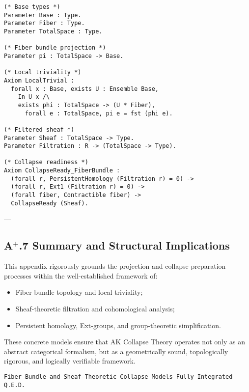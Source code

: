 \documentclass[11pt]{article}
\begin{document}
\begin{lstlisting}[language=Coq]
(* Base types *)
Parameter Base : Type.
Parameter Fiber : Type.
Parameter TotalSpace : Type.

(* Fiber bundle projection *)
Parameter pi : TotalSpace -> Base.

(* Local triviality *)
Axiom LocalTrivial :
  forall x : Base, exists U : Ensemble Base,
    In U x /\
    exists phi : TotalSpace -> (U * Fiber),
      forall e : TotalSpace, pi e = fst (phi e).

(* Filtered sheaf *)
Parameter Sheaf : TotalSpace -> Type.
Parameter Filtration : R -> (TotalSpace -> Type).

(* Collapse readiness *)
Axiom CollapseReady_FiberBundle :
  (forall r, PersistentHomology (Filtration r) = 0) ->
  (forall r, Ext1 (Filtration r) = 0) ->
  (forall fiber, Contractible fiber) ->
  CollapseReady (Sheaf).
\end{lstlisting}

---

\subsection*{A$^{+}$.7 Summary and Structural Implications}

This appendix rigorously grounds the projection and collapse preparation processes within the well-established framework of:

\begin{itemize}
    \item Fiber bundle topology and local triviality;
    \item Sheaf-theoretic filtration and cohomological analysis;
    \item Persistent homology, Ext-groups, and group-theoretic simplification.
\end{itemize}

These concrete models ensure that AK Collapse Theory operates not only as an abstract categorical formalism, but as a geometrically sound, topologically rigorous, and logically verifiable framework.

\begin{flushright}
\texttt{Fiber Bundle and Sheaf-Theoretic Collapse Models \quad Fully Integrated \quad Q.E.D.}
\end{flushright}



\end{document}

